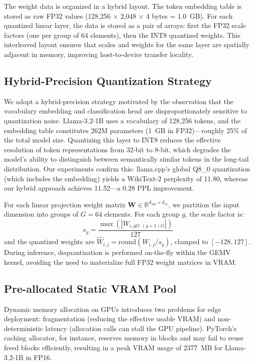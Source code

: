 \documentclass[conference]{IEEEtran}
\begin{document}
The weight data is organized in a hybrid layout. The token embedding table is stored as raw FP32 values (128,256 $\times$ 2,048 $\times$ 4 bytes = 1.0~GB). For each quantized linear layer, the data is stored as a pair of arrays: first the FP32 scale factors (one per group of 64 elements), then the INT8 quantized weights. This interleaved layout ensures that scales and weights for the same layer are spatially adjacent in memory, improving host-to-device transfer locality.

\subsection{Hybrid-Precision Quantization Strategy}
We adopt a hybrid-precision strategy motivated by the observation that the vocabulary embedding and classification head are disproportionately sensitive to quantization noise. Llama-3.2-1B uses a vocabulary of 128,256 tokens, and the embedding table constitutes 262M parameters (1~GB in FP32)---roughly 25\% of the total model size. Quantizing this layer to INT8 reduces the effective resolution of token representations from 32-bit to 8-bit, which degrades the model's ability to distinguish between semantically similar tokens in the long-tail distribution. Our experiments confirm this: llama.cpp's global Q8\_0 quantization (which includes the embedding) yields a WikiText-2 perplexity of 11.80, whereas our hybrid approach achieves 11.52---a 0.28 PPL improvement.

For each linear projection weight matrix $\mathbf{W} \in \mathbb{R}^{d_{out} \times d_{in}}$, we partition the input dimension into groups of $G=64$ elements. For each group $g$, the scale factor is:
\begin{equation}
    s_g = \frac{\max(|W_{i, gG:(g+1)G}|)}{127}
\end{equation}
and the quantized weights are $\hat{W}_{i,j} = \text{round}(W_{i,j} / s_g)$, clamped to $[-128, 127]$. During inference, dequantization is performed on-the-fly within the GEMV kernel, avoiding the need to materialize full FP32 weight matrices in VRAM.

\subsection{Pre-allocated Static VRAM Pool}
Dynamic memory allocation on GPUs introduces two problems for edge deployment: fragmentation (reducing the effective usable VRAM) and non-deterministic latency (allocation calls can stall the GPU pipeline). PyTorch's caching allocator, for instance, reserves memory in blocks and may fail to reuse freed blocks efficiently, resulting in a peak VRAM usage of 2377~MB for Llama-3.2-1B in FP16.
\end{document}
